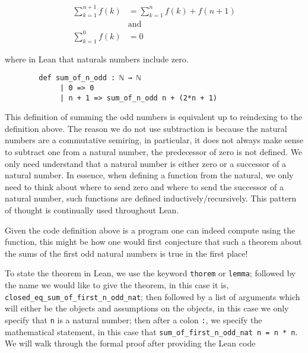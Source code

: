 \begin{example}
    \begin{align*}
        \sum_{k = 1}^{n + 1} f(k) &= \sum_{k = 1}^{n} f(k) + f(n + 1) \tag{for $n \geq 0$}\\
            &\text{and}\\
        \sum_{k = 1}^{0} f(k) &= 0
    \end{align*}

    where in Lean that naturals numbers include zero.

\begin{footnotesize}
\begin{verbatim}
        def sum_of_n_odd : ℕ → ℕ
             | 0 => 0
             | n + 1 => sum_of_n_odd n + (2*n + 1)
\end{verbatim}
\end{footnotesize}

    This definition of summing the odd numbers is equivalent up to reindexing to the definition above. The reason we do not use subtraction is because
    the natural numbers are a commutative semiring, in particular, it does not always make sense to subtract one from a natural number, the predecessor of
    zero is not defined. We only need understand that a natural number is either zero or a successor of a natural number. In essence, when defining a function from the natural,
    we only need to think about where to send zero and where to send the successor of a natural number, such functions are defined inductively/recursively.
    This pattern of thought is continually used throughout Lean.

    Given the code definition above is a program one can indeed compute using the
    function, this might be how one would first conjecture that such a theorem about 
    the sums of the first odd natural numbers is true in the first place!

    To state the theorem in Lean, we use the keyword \texttt{thorem} or \texttt{lemma};
    followed by the name we would like to give the theorem, in this case it is, \texttt{closed\_eq\_sum\_of\_first\_n\_odd\_nat};
    then followed by a list of arguments which will either be the objects and assumptions on the objects, in this case we only
    specify that \texttt{n} is a natural number; then after a colon \texttt{:}, we specify the mathematical statement,
    in this case that \texttt{sum\_of\_first\_n\_odd\_nat n = n * n}. 
    We will walk through the formal proof after providing the Lean code



\end{example}
